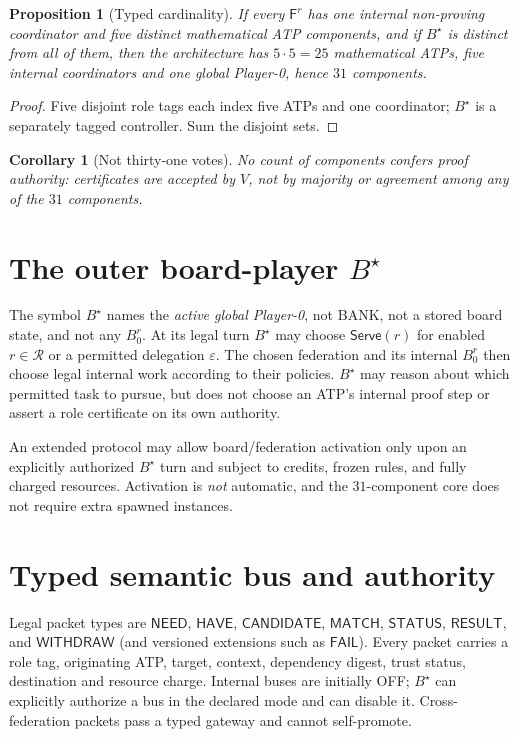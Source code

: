 \documentclass[11pt,letterpaper,oneside]{book}
\newtheorem{proposition}[theorem]{Proposition}
\newtheorem{corollary}[theorem]{Corollary}
\theoremstyle{definition}
\theoremstyle{remark}
\newcommand{\Rls}{\mathcal R}
\newcommand{\F}{\mathsf F}
\newcommand{\Serve}{\mathsf{Serve}}
\begin{document}
\begin{proposition}[Typed cardinality]
If every $\F^r$ has one internal non-proving coordinator and five distinct
mathematical ATP components, and if $B^\star$ is distinct from all of them,
then the architecture has $5\cdot5=25$ mathematical ATPs, five internal
coordinators and one global Player-0, hence $31$ components.
\end{proposition}
\begin{proof}Five disjoint role tags each index five ATPs and one coordinator;
$B^\star$ is a separately tagged controller. Sum the disjoint sets.\end{proof}
\begin{corollary}[Not thirty-one votes]
No count of components confers proof authority: certificates are accepted by
$V$, not by majority or agreement among any of the $31$ components.
\end{corollary}

\section{The outer board-player $B^\star$}
The symbol $B^\star$ names the \emph{active global Player-0}, not BANK,
not a stored board state, and not any $B_0^r$. At its legal turn $B^\star$
may choose $\Serve(r)$ for enabled $r\in\Rls$ or a permitted delegation
$\varepsilon$. The chosen federation and its internal $B_0^r$ then choose
legal internal work according to their policies. $B^\star$ may reason about
which permitted task to pursue, but does not choose an ATP's internal proof
step or assert a role certificate on its own authority.

An extended protocol may allow board/federation activation only upon
an explicitly authorized $B^\star$ turn and subject to credits, frozen
rules, and fully charged resources. Activation is \emph{not} automatic,
and the $31$-component core does not require extra spawned instances.

\section{Typed semantic bus and authority}
Legal packet types are $\mathsf{NEED}$, $\mathsf{HAVE}$,
$\mathsf{CANDIDATE}$, $\mathsf{MATCH}$, $\mathsf{STATUS}$,
$\mathsf{RESULT}$, and $\mathsf{WITHDRAW}$ (and versioned extensions
such as $\mathsf{FAIL}$). Every packet carries a role tag, originating
ATP, target, context, dependency digest, trust status, destination and
resource charge. Internal buses are initially OFF; $B^\star$ can
explicitly authorize a bus in the declared mode and can disable it.
Cross-federation packets pass a typed gateway and cannot self-promote.
\end{document}
